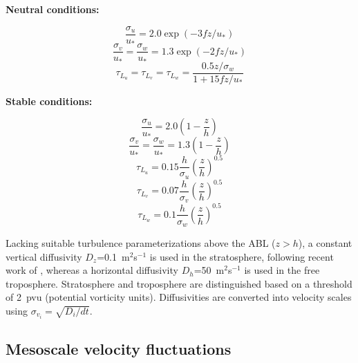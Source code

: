 \documentclass{egu}                  %
\begin{document}
{\bf Neutral conditions:}

\begin{equation}
\frac{\sigma_u}{u_*}=2.0\exp(-3fz/u_*)
\end{equation}
\begin{equation}
\frac{\sigma_v}{u_*}=\frac{\sigma_w}{u_*}=1.3\exp(-2fz/u_*)
\end{equation}
\begin{equation}
\tau_{L_u}=\tau_{L_v}=\tau_{L_w}=\frac{0.5z/\sigma_w}{1+15fz/u_*}
\end{equation}

{\bf Stable conditions:}

\begin{equation}
\frac{\sigma_u}{u_*}=2.0\left(1-\frac{z}{h}\right)
\end{equation}
\begin{equation}
\frac{\sigma_v}{u_*}=\frac{\sigma_w}{u_*}=1.3\left(1-\frac{z}{h}\right)
\end{equation}
\begin{equation}
\tau_{L_u}=0.15\frac{h}{\sigma_u}\left(\frac{z}{h}\right)^{0.5}
\end{equation}
\begin{equation}
\tau_{L_v}=0.07\frac{h}{\sigma_v}\left(\frac{z}{h}\right)^{0.5}
\end{equation}
\begin{equation}
\tau_{L_w}=0.1\frac{h}{\sigma_w}\left(\frac{z}{h}\right)^{0.5}
\end{equation}

Lacking suitable turbulence parameterizations above the ABL ($z>h$), a constant
vertical diffusivity $D_z$=0.1~m$^2$s$^{-1}$ is used in the stratosphere,
following recent work of \citet{legras2003}, whereas a horizontal diffusivity
$D_h$=50~m$^2$s$^{-1}$ is used in the free troposphere.  Stratosphere and
troposphere are distinguished based on a threshold of 2~pvu (potential
vorticity units).  Diffusivities are converted into velocity scales using
$\sigma_{v_i}=\sqrt{D_i/dt}$.

\subsection{Mesoscale velocity fluctuations}
\end{document}
